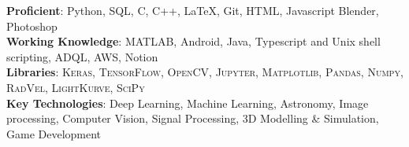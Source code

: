 \documentclass[11pt]{res} %
\newcommand{\titlegap}{5pt} %
\newcommand{\censectgap}{-.05in}
\begin{document}
\begin{resume}
\textbf{Proficient}: Python, SQL, C, C++, \LaTeX, Git, HTML, Javascript Blender, Photoshop \vspace{0.05in}\\
\textbf{Working Knowledge}: MATLAB, Android, Java, Typescript and Unix shell scripting, ADQL, AWS, Notion
\vspace{0.05in}\\
\textbf{Libraries}: \textsc{Keras, TensorFlow, OpenCV, Jupyter, Matplotlib, Pandas, Numpy, RadVel, LightKurve, SciPy}
\vspace{0.05in}\\
\textbf{Key Technologies}: Deep Learning, Machine Learning, Astronomy, Image processing, Computer Vision, Signal Processing, 3D Modelling \& Simulation, Game Development \\

\vspace{0.1in}
\hline








\end{resume} 
\end{document}

